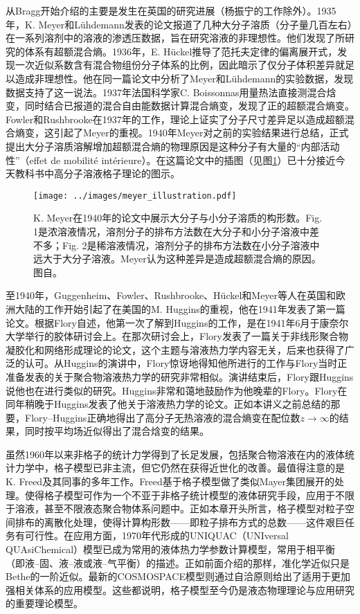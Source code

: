 \documentclass[main.tex]{subfiles}
\begin{document}
从Bragg开始介绍的主要是发生在英国的研究进展（杨振宁的工作除外）。1935年，K. Meyer和Lühdemann发表的论文报道了几种大分子溶质（分子量几百左右）在一系列溶剂中的溶液的渗透压数据，旨在研究溶液的非理想性\cite{Meyer1935}。他们发现了所研究的体系有超额混合熵。1936年，E. Hückel\cite{Hueckel1936}推导了范托夫定律的偏离展开式，发现一次近似系数含有混合物组份分子体系的比例，因此暗示了仅分子体积差异就足以造成非理想性。他在同一篇论文中分析了Meyer和Lühdemann的实验数据，发现数据支持了这一说法。1937年法国科学家C. Boissonnas用量热法直接测混合焓变，同时结合已报道的混合自由能数据计算混合熵变，发现了正的超额混合熵变\cite{Boissonnas1937}。Fowler和Rushbrooke在1937年的工作，理论上证实了分子尺寸差异足以造成超额混合熵变，这引起了Meyer的重视。1940年Meyer对之前的实验结果进行总结\cite{Meyer1940}，正式提出大分子溶质溶解增加超额混合熵的物理原因是这种分子有大量的“内部活动性”（effet de mobilité intérieure）。在这篇论文中的插图（见图\ref{fig:meyer_illustration}）已十分接近今天教科书中高分子溶液格子理论的图示。

\begin{figure}[ht]
    \centering
    \texttt{[image: ../images/meyer\_illustration.pdf]}
    \caption{K. Meyer在1940年的论文中展示大分子与小分子溶质的构形数。Fig. 1是浓溶液情况，溶剂分子的排布方法数在大分子和小分子溶液中差不多；Fig. 2是稀溶液情况，溶剂分子的排布方法数在小分子溶液中远大于大分子溶液。Meyer认为这种差异是造成超额混合熵的原因。图自\cite{Meyer1940}。}
    \label{fig:meyer_illustration}
\end{figure}

至1940年，Guggenheim、Fowler、Rushbrooke、Hückel和Meyer等人在英国和欧洲大陆的工作开始引起了在美国的M. Huggins的重视，他在1941年发表了第一篇论文\cite{Huggins1941}。根据Flory自述\cite{Flory1985}，他第一次了解到Huggins的工作，是在1941年6月于康奈尔大学举行的胶体研讨会上。在那次研讨会上，Flory发表了一篇关于非线形聚合物凝胶化和网络形成理论的论文，这个主题与溶液热力学内容无关，后来也获得了广泛的认可。从Huggins的演讲中，Flory惊讶地得知他所进行的工作与Flory当时正准备发表的关于聚合物溶液热力学的研究非常相似。演讲结束后，Flory跟Huggins说他也在进行类似的研究。Huggins非常和蔼地鼓励作为他晚辈的Flory。Flory在同年稍晚于Huggins发表了他关于溶液热力学的论文\cite{Flory1941}。正如本讲义之前总结的那要，Flory--Huggins正确地得出了高分子无热溶液的混合熵变在配位数$z\to\infty$的结果，同时按平均场近似得出了混合焓变的结果。

虽然1960年以来非格子的统计力学得到了长足发展，包括聚合物溶液在内的液体统计力学中，格子模型已非主流，但它仍然在获得近世化的改善。最值得注意的是K. Freed及其同事的多年工作。Freed基于格子模型做了类似Mayer集团展开的处理。使得格子模型可作为一个不亚于非格子统计模型的液体研究手段\cite{Dudowicz1990}，应用于不限于溶液，甚至不限液态聚合物体系问题中\cite{Foreman1998,Dudowicz2007,Xu2016}。正如本章开头所言，格子模型对粒子空间排布的离散化处理，使得计算构形数——即粒子排布方式的总数——这件艰巨任务有可行性。在应用方面，1970年代形成的UNIQUAC（UNIversal QUAsiChemical）模型\cite{Abrams1975,Maurer1978}已成为常用的液体热力学参数计算模型，常用于相平衡（即液--固、液--液或液--气平衡）的描述。正如前面介绍的那样，准化学近似只是Bethe的一阶近似。最新的COSMOSPACE模型\cite{Klamt2002}则通过自洽原则给出了适用于更加强相关体系的应用模型。这些都说明，格子模型至今仍是液态物理理论与应用研究的重要理论模型。
\end{document}
